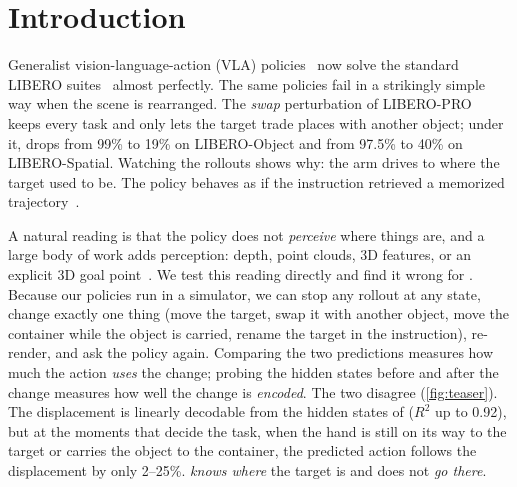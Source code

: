 \section{Introduction}
\label{sec:intro}

Generalist vision-language-action (VLA) policies~\cite{brohan2023rt2,kim2024openvla,black2024pi0,pi2025pi05} now solve
the standard LIBERO suites~\cite{liu2023libero} almost perfectly.
The same policies fail in a strikingly simple way when the scene is rearranged.
The \emph{swap} perturbation of LIBERO-PRO~\cite{zhou2025liberopro} keeps every task and only lets the target trade places
with another object; under it, \pizf drops from 99\% to 19\% on LIBERO-Object and from 97.5\% to 40\% on LIBERO-Spatial.
Watching the rollouts shows why: the arm drives to where the target used to be.
The policy behaves as if the instruction retrieved a memorized trajectory~\cite{chen2026ect}.

A natural reading is that the policy does not \emph{perceive} where things are, and a large body of work adds
perception: depth, point clouds, 3D features, or an explicit 3D goal point~\cite{zhen20243dvla,qu2025spatialvla,tsai2026point}.
We test this reading directly and find it wrong for \pizf.
Because our policies run in a simulator, we can stop any rollout at any state, change exactly one thing (move the target,
swap it with another object, move the container while the object is carried, rename the target in the instruction),
re-render, and ask the policy again.
Comparing the two predictions measures how much the action \emph{uses} the change; probing the hidden states before and
after the change measures how well the change is \emph{encoded}.
The two disagree (\cref{fig:teaser}).
The displacement is linearly decodable from the hidden states of \pizf ($R^2$ up to 0.92), but at the moments that decide
the task, when the hand is still on its way to the target or carries the object to the container, the predicted action
follows the displacement by only 2--25\%.
\pizf \emph{knows where} the target is and does not \emph{go there}.

